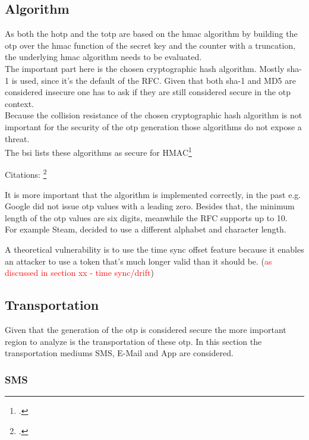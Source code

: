 \subsection{Algorithm}

As both the \gls{hotp} and the \gls{totp} are based on the \gls{hmac} algorithm by building the \gls{otp} over the \gls{hmac} function of the secret key and the counter with a truncation, the underlying \gls{hmac} algorithm needs to be evaluated.\\
The important part here is the chosen cryptographic hash algorithm. Mostly \gls{sha}-1 is used, since it's the default of the RFC. Given that both \gls{sha}-1 and MD5 are considered insecure one has to ask if they are still considered secure in the \gls{otp} context.\\
Because the collision resistance of the chosen cryptographic hash algorithm is not important for the security of the \gls{otp} generation those algorithms do not expose a threat.\\
The \gls{bsi} lists these algorithms as secure for HMAC\footcite{bsi2019recommendations}

Citations: \footcite{10.1007/978-3-319-63688-7_19}

It is more important that the algorithm is implemented correctly, in the past e.g. Google did not issue \gls{otp} values with a leading zero. Besides that, the minimum length of the \gls{otp} values are six digits, meanwhile the RFC supports up to 10.\\
For example Steam, decided to use a different alphabet and character length.

A theoretical vulnerability is to use the time sync offset feature because it enables an attacker to use a token that's much longer valid than it should be. (\textcolor{red}{as discussed in section xx - time sync/drift})

\subsection{Transportation}

Given that the generation of the \gls{otp} is considered secure the more important region to analyze is the transportation of these \gls{otp}. In this section the transportation mediums SMS, E-Mail and App are considered.

\subsubsection{SMS}

